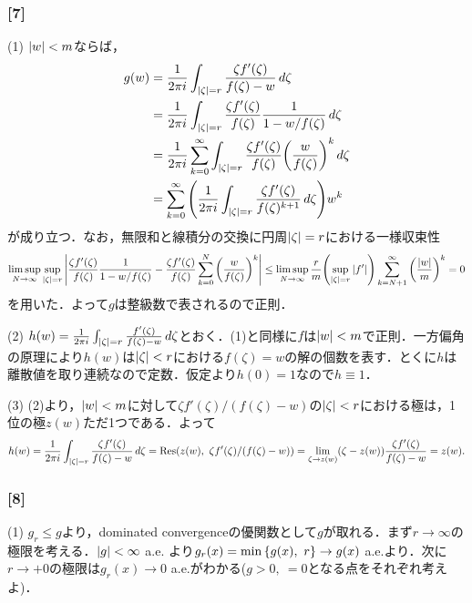 \documentclass[a4j]{ltjsarticle}
\newcommand{\1}{\mathbbm{1}}
\numberwithin{equation}{section}
\theoremstyle{definition}
\begin{document}
\subsubsection*{[7]}
(1) $\abs{w}<m$ならば，
\begin{align}
    g(w)&=\frac{1}{2\pi i}\int_{\abs{\zeta}=r}\frac{\zeta f'(\zeta)}{f(\zeta)-w}\,d\zeta \\
    &=\frac{1}{2\pi i}\int_{\abs{\zeta}=r}\frac{\zeta f'(\zeta)}{f(\zeta)}\frac{1}{1-w/f(\zeta)}\,d\zeta\\
    &=\frac{1}{2\pi i}\sum_{k=0}^{\infty}\int_{\abs{\zeta}=r}\frac{\zeta f'(\zeta)}{f(\zeta)}\qty(\frac{w}{f(\zeta)})^k\,d\zeta \\
    &=\sum_{k=0}^{\infty}\qty(\frac{1}{2\pi i}\int_{\abs{\zeta}=r}\frac{\zeta f'(\zeta)}{f(\zeta)^{k+1}}\,d\zeta)w^{k}
\end{align}
が成り立つ．なお，無限和と線積分の交換に円周$\abs{\zeta}=r$における一様収束性
\begin{equation}
    \limsup_{N\to\infty}\sup_{\abs{\zeta}=r}\abs{\frac{\zeta f'(\zeta)}{f(\zeta)}\frac{1}{1-w/f(\zeta)}-\frac{\zeta f'(\zeta)}{f(\zeta)}\sum_{k=0}^N \qty(\frac{w}{f(\zeta)})^k}\leq \limsup_{N\to\infty} \frac{r}{m}\qty(\sup_{\abs{\zeta}=r}\abs{f'})\sum_{k=N+1}^\infty\qty(\frac{\abs{w}}{m})^k=0 
\end{equation}
を用いた．よって$g$は整級数で表されるので正則．

(2) $h(w)=\frac{1}{2\pi i}\int_{\abs{\zeta}=r}\frac{f'(\zeta)}{f(\zeta)-w}\,d\zeta$とおく．(1)と同様に$f$は$\abs{w}<m$で正則．一方偏角の原理により$h(w)$は$\abs{\zeta}<r$における$f(\zeta)=w$の解の個数を表す．とくに$h$は離散値を取り連続なので定数．仮定より$h(0)=1$なので$h\equiv 1$．

(3) (2)より，$\abs{w}<m$に対して$\zeta f'(\zeta)/(f(\zeta)-w)$の$\abs{\zeta}<r$における極は，1位の極$z(w)$ただ1つである．よって
\begin{equation}
    h(w)=\frac{1}{2\pi i}\int_{\abs{\zeta}=r}\frac{\zeta f'(\zeta)}{f(\zeta)-w}\,d\zeta=\Residue(z(w),\ \zeta f'(\zeta)/(f(\zeta)-w))=\lim_{\zeta\to z(w)}(\zeta-z(w))\frac{\zeta f'(\zeta)}{f(\zeta)-w}=z(w).
\end{equation}
\subsubsection*{[8]}
(1) $g_r\leq g$より，dominated convergenceの優関数として$g$が取れる．まず$r\to\infty$の極限を考える．$\abs{g}<\infty$ a.e. より$g_r(x)=\min\qty{g(x),\ r}\to g(x)$ a.e.より．次に$r\to+0$の極限は$g_r(x)\to 0 $ a.e.がわかる($g>0,\ =0$となる点をそれぞれ考えよ)．
\end{document}
